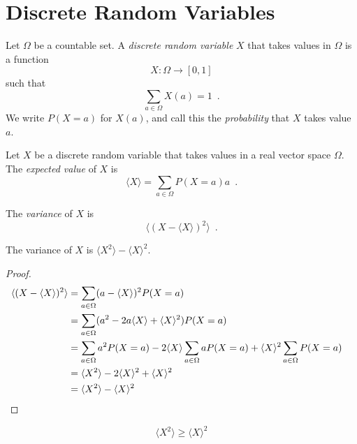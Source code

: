 \chapter{Discrete Random Variables}

\begin{df}
Let $\Omega$ be a countable set. A \emph{discrete random variable} $X$ that takes values in $\Omega$ is a function
\[ X : \Omega \rightarrow [0,1] \]
such that
\[ \sum_{a \in \Omega} X(a) = 1 \enspace . \]
We write $P(X = a)$ for $X(a)$, and call this the \emph{probability} that $X$ takes value $a$.
\end{df}

\begin{df}
Let $X$ be a discrete random variable that takes values in a real vector space $\Omega$. %
The \emph{expected value} of $X$ is
\[ \langle X \rangle = \sum_{a \in \Omega} P(X = a) a \enspace . \]
\end{df}

\begin{df}[Variance]
The \emph{variance} of $X$ is
\[ \langle (X - \langle X \rangle)^2 \rangle \enspace . \]
\end{df}

\begin{prop}
The variance of $X$ is $\langle X^2 \rangle - \langle X \rangle^2$.
\end{prop}

\begin{proof}
\pf
\begin{align*}
\langle (X - \langle X \rangle)^2 \rangle
& = \sum_{a \in \Omega} (a - \langle X \rangle)^2 P(X = a) \\
& = \sum_{a \in \Omega} (a^2 - 2 a \langle X \rangle + \langle X \rangle^2) P(X = a) \\
& = \sum_{a \in \Omega} a^2 P(X=a) - 2 \langle X \rangle \sum_{a \in \Omega} a P(X = a) + \langle X \rangle^2 \sum_{a \in \Omega} P(X = a) \\
& = \langle X^2 \rangle - 2 \langle X \rangle^2 + \langle X \rangle^2 \\
& = \langle X^2 \rangle - \langle X \rangle^2 & \qed
\end{align*}
\end{proof}

\begin{cor}
\[ \langle X^2 \rangle \geq \langle X \rangle^2 \]
\end{cor}

